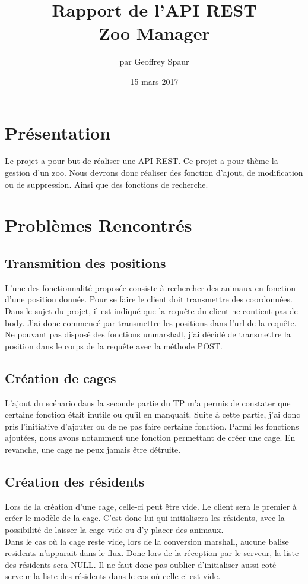 \documentclass{article}
\title{Rapport de l'API REST \\ Zoo Manager}
\author{par Geoffrey Spaur}
\date{15 mars 2017}
\begin{document}
\maketitle
\newpage
\tableofcontents{}
\newpage
\section{Présentation}
	Le projet a pour but de réaliser une API REST. Ce projet a pour thème la gestion d'un zoo. Nous devrons donc réaliser des fonction d'ajout, de modification ou de suppression. Ainsi que des fonctions de recherche.
	
\section{Problèmes Rencontrés}

\subsection{Transmition des positions}
L'une des fonctionnalité proposée consiste à rechercher des animaux en fonction d'une position donnée. Pour se faire le client doit transmettre des coordonnées. Dans le sujet du projet, il est indiqué que la requête du client ne contient pas de body. J'ai donc commencé par transmettre les positions dans l'url de la requête. Ne pouvant pas disposé des fonctions unmarshall, j'ai décidé de transmettre la position dans le corps de la requête avec la méthode POST.

\subsection{Création de cages}
L'ajout du scénario dans la seconde partie du TP m'a permis de constater que certaine fonction était inutile ou qu'il en manquait. Suite à cette partie, j'ai donc pris l'initiative d'ajouter ou de ne pas faire certaine fonction.
Parmi les fonctions ajoutées, nous avons notamment une fonction permettant de créer une cage. En revanche, une cage ne peux jamais être détruite.

\subsection{Création des résidents}
Lors de la création d'une cage, celle-ci peut être vide. Le client sera le premier à créer le modèle de la cage. C'est donc lui qui initialisera les résidents, avec la possibilité de laisser la cage vide ou d'y placer des animaux. \\
Dans le cas où la cage reste vide, lors de la conversion marshall, aucune balise residents n'apparait dans le flux. Donc lors de la réception par le serveur, la liste des résidents sera NULL. Il ne faut donc pas oublier d'initialiser aussi coté serveur la liste des résidents dans le cas où celle-ci est vide.
\end{document}
